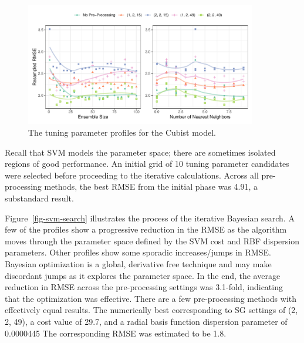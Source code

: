 \documentclass[
  letterpaper,
  DIV=11,
  numbers=noendperiod]{scrartcl}
\begin{document}
\begin{figure}[t!]

{\centering \includegraphics[width=0.9\textwidth,height=\textheight]{figures/fig-cb-profiles-1.pdf}

}

\caption{\label{fig-cb-profiles}The tuning parameter profiles for the
Cubist model.}

\end{figure}

Recall that SVM models the parameter space; there are sometimes isolated
regions of good performance. An initial grid of 10 tuning parameter
candidates were selected before proceeding to the iterative
calculations. Across all pre-processing methods, the best RMSE from the
initial phase was 4.91, a substandard result.

Figure~\ref{fig-svm-search} illustrates the process of the iterative
Bayesian search. A few of the profiles show a progressive reduction in
the RMSE as the algorithm moves through the parameter space defined by
the SVM cost and RBF dispersion parameters. Other profiles show some
sporadic increases/jumps in RMSE. Bayesian optimization is a global,
derivative free technique and may make discordant jumps as it explores
the parameter space. In the end, the average reduction in RMSE across
the pre-processing settings was 3.1-fold, indicating that the
optimization was effective. There are a few pre-processing methods with
effectively equal results. The numerically best corresponding to SG
settings of (2, 2, 49), a cost value of 29.7, and a radial basis
function dispersion parameter of 0.0000445 The corresponding RMSE was
estimated to be 1.8.
\end{document}
